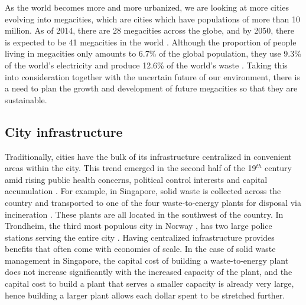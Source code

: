 \documentclass[preprint,12pt,authoryear]{elsarticle}
\begin{document}
As the world becomes more and more urbanized, we are looking at more cities evolving into megacities, which are cities which have populations of more than 10 million. As of 2014, there are 28 megacities across the globe, and by 2050, there is expected to be 41 megacities in the world \citep{wup2014}. Although the proportion of people living in megacities only amounts to 6.7\% of the global population, they use 9.3\% of the world's electricity and produce 12.6\% of the world's waste \citep{kennedy2015}. Taking this into consideration together with the uncertain future of our environment, there is a need to plan the growth and development of future megacities so that they are sustainable. 

\subsection{City infrastructure}
Traditionally, cities have the bulk of its infrastructure centralized in convenient areas within the city. This trend emerged in the second half of the 19$^{th}$ century amid rising public health concerns, political control interests and capital accumulation \citep{gandy2004, dingle2008}. For example, in Singapore, solid waste is collected across the country and transported to one of the four waste-to-energy plants for disposal via incineration \citep{nea2016}. These plants are all located in the southwest of the country.  In Trondheim, the third most populous city in Norway \citep{statistisk2013}, has two large police stations serving the entire city \citep{politinorway}. Having centralized infrastructure provides benefits that often come with economies of scale. In the case of solid waste management in Singapore, the capital cost of building a waste-to-energy plant does not increase significantly with the increased capacity of the plant, and the capital cost to build a plant that serves a smaller capacity is already very large, hence building a larger plant allows each dollar spent to be stretched further.
\end{document}
